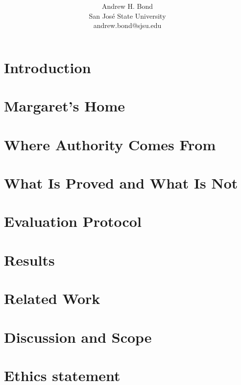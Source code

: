\documentclass[10pt,twocolumn]{article}
\title{%
}
\author{Andrew H. Bond\\San Jos\'e State University\\andrew.bond@sjsu.edu}\fi
\date{}
\begin{document}
\maketitle

\begin{abstract}
\end{abstract}

\section{Introduction}
\label{sec:intro}

\section{Margaret's Home}
\label{sec:home}

\section{Where Authority Comes From}
\label{sec:arch}
\begin{figure}[t]
\centering
\resizebox{\textwidth}{!}{}
\caption{%
}
\label{fig:arch}
\end{figure}
\begin{figure}[t]
\centering
\resizebox{\columnwidth}{!}{}
\caption{%
}
\label{fig:strata}
\end{figure}

\section{What Is Proved and What Is Not}
\label{sec:proof}

\section{Evaluation Protocol}
\label{sec:protocol}

\section{Results}
\label{sec:results}

\section{Related Work}
\label{sec:related}

\section{Discussion and Scope}
\label{sec:discussion}

\section*{Ethics statement}



\end{document}
